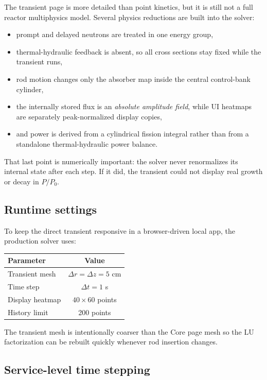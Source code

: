 \documentclass[11pt]{article}
\begin{document}
The transient page is more detailed than point kinetics, but it is still not a
full reactor multiphysics model.  Several physics reductions are built into the
solver:
\begin{itemize}
  \item prompt and delayed neutrons are treated in one energy group,
  \item thermal-hydraulic feedback is absent, so all cross sections stay fixed
        while the transient runs,
  \item rod motion changes only the absorber map inside the central control-bank
        cylinder,
  \item the internally stored flux is an \emph{absolute amplitude field}, while
        UI heatmaps are separately peak-normalized display copies,
  \item and power is derived from a cylindrical fission integral rather than from
        a standalone thermal-hydraulic power balance.
\end{itemize}

That last point is numerically important: the solver never renormalizes its
internal state after each step.  If it did, the transient could not display real
growth or decay in $P/P_0$.

\subsection{Runtime settings}

To keep the direct transient responsive in a browser-driven local app, the
production solver uses:

\begin{center}
\begin{tabular}{lc}
\toprule
Parameter & Value \\
\midrule
Transient mesh & $\Delta r = \Delta z = 5$ cm \\
Time step & $\Delta t = 1$ s \\
Display heatmap & $40 \times 60$ points \\
History limit & 200 points \\
\bottomrule
\end{tabular}
\end{center}

The transient mesh is intentionally coarser than the Core page mesh so the LU
factorization can be rebuilt quickly whenever rod insertion changes.

\subsection{Service-level time stepping}
\end{document}
